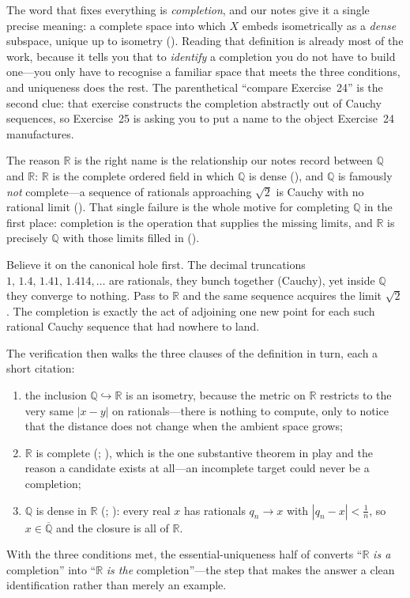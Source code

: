 \documentclass[main.tex]{subfiles}
\begin{document}
\begin{Reflection}
The word that fixes everything is \emph{completion}, and our notes give it a single precise meaning: a
complete space into which $X$ embeds isometrically as a \emph{dense} subspace, unique up to isometry
(). Reading that definition is already most of the work, because it tells you that to
\emph{identify} a completion you do not have to build one---you only have to recognise a familiar space
that meets the three conditions, and uniqueness does the rest. The parenthetical ``compare Exercise~24''
is the second clue: that exercise constructs the completion abstractly out of Cauchy sequences, so
Exercise~25 is asking you to put a name to the object Exercise~24 manufactures.

The reason $\mathbb R$ is the right name is the relationship our notes record between $\mathbb Q$ and
$\mathbb R$: $\mathbb R$ is the complete ordered field in which $\mathbb Q$ is dense (), and
$\mathbb Q$ is famously \emph{not} complete---a sequence of rationals approaching $\sqrt2$ is Cauchy with
no rational limit (). That single failure is the whole motive for completing $\mathbb Q$ in
the first place: completion is the operation that supplies the missing limits, and $\mathbb R$ is
precisely $\mathbb Q$ with those limits filled in ().

Believe it on the canonical hole first. The decimal truncations $1,\,1.4,\,1.41,\,1.414,\dots$ are
rationals, they bunch together (Cauchy), yet inside $\mathbb Q$ they converge to nothing. Pass to
$\mathbb R$ and the same sequence acquires the limit $\sqrt2$. The completion is exactly the act of
adjoining one new point for each such rational Cauchy sequence that had nowhere to land.

The verification then walks the three clauses of the definition in turn, each a short citation:
\begin{enumerate}[leftmargin=1.7em,itemsep=3pt,topsep=2pt,label=\textnormal{(\arabic*)}]
  \item the inclusion $\mathbb Q\hookrightarrow\mathbb R$ is an isometry, because the metric on $\mathbb
        R$ restricts to the very same $|x-y|$ on rationals---there is nothing to compute, only to notice
        that the distance does not change when the ambient space grows;
  \item $\mathbb R$ is complete (; ), which is
        the one substantive theorem in play and the reason a candidate exists at all---an incomplete
        target could never be a completion;
  \item $\mathbb Q$ is dense in $\mathbb R$ (; ):
        every real $x$ has rationals $q_n\to x$ with $|q_n-x|<\tfrac1n$, so $x\in\overline{\mathbb Q}$
        and the closure is all of $\mathbb R$.
\end{enumerate}
With the three conditions met, the essential-uniqueness half of  converts ``$\mathbb R$
\emph{is a} completion'' into ``$\mathbb R$ \emph{is the} completion''---the step that makes the answer a
clean identification rather than merely an example.


\end{Reflection}
\end{document}
